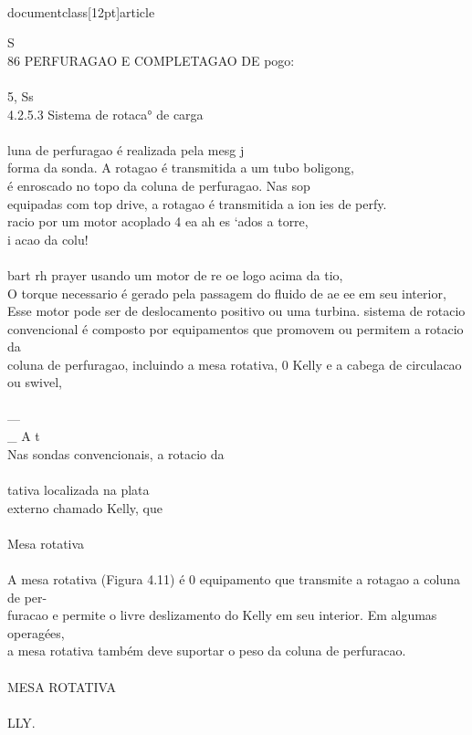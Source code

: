 \\documentclass[12pt]{article}
\begin{document}
S\\
86 PERFURAGAO E COMPLETAGAO DE pogo:\\
\\
5, Ss\\
4.2.5.3 Sistema de rotaca° de carga\\
\\
luna de perfuragao é realizada pela mesg j\\
forma da sonda. A rotagao é transmitida a um tubo boligong,\\
é enroscado no topo da coluna de perfuragao. Nas sop\\
equipadas com top drive, a rotagao é transmitida a ion ies de perfy.\\
racio por um motor acoplado 4 ea ah es ‘ados a torre,\\
i acao da colu!\\
\\
bart rh prayer usando um motor de re oe logo acima da tio,\\
O torque necessario é gerado pela passagem do fluido de ae ee em seu interior,\\
Esse motor pode ser de deslocamento positivo ou uma turbina. sistema de rotacio\\
convencional é composto por equipamentos que promovem ou permitem a rotacio da\\
coluna de perfuragao, incluindo a mesa rotativa, 0 Kelly e a cabega de circulacao ou swivel,\\
\\
—\\_ A t\\
Nas sondas convencionais, a rotacio da\\
\\
tativa localizada na plata\\
externo chamado Kelly, que\\
\\
Mesa rotativa\\
\\
A mesa rotativa (Figura 4.11) é 0 equipamento que transmite a rotagao a coluna de per-\\
furacao e permite o livre deslizamento do Kelly em seu interior. Em algumas operagées,\\
a mesa rotativa também deve suportar o peso da coluna de perfuracao.\\
\\
MESA ROTATIVA\\
\\
LLY.\\
\end{document}
